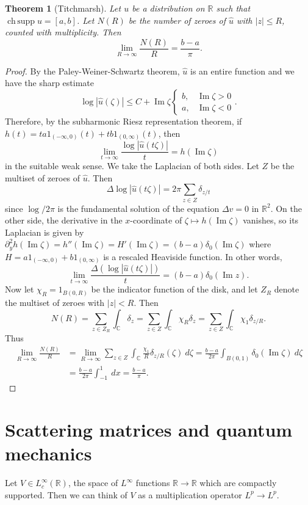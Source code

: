 \documentclass[12pt]{report}
\newcommand{\RR}{\mathbb{R}}
\newcommand{\CC}{\mathbb{C}}
\DeclareMathOperator*{\chsupp}{ch\,supp}
\renewcommand{\Im}{\operatorname{Im}}
\newtheorem{theorem}{Theorem}[chapter]
\theoremstyle{definition}
\begin{document}
\begin{theorem}[Titchmarsh]
Let $u$ be a distribution on $\RR$ such that $\chsupp u = [a, b]$. Let $N(R)$ be the number of zeroes of $\hat u$ with $|z| \leq R$, counted with multiplicity. Then
$$\lim_{R \to \infty} \frac{N(R)}{R} = \frac{b-a}{\pi}.$$
\end{theorem}
\begin{proof}
By the Paley-Weiner-Schwartz theorem, $\hat u$ is an entire function and we have the sharp estimate
$$\log |\hat u(\zeta)| \leq C + \Im \zeta \begin{cases}
    b, &\Im \zeta > 0\\
    a, &\Im \zeta < 0
\end{cases}.$$
Therefore, by the subharmonic Riesz representation theorem, if $h(t) = ta1_{(-\infty, 0)}(t) + tb1_{(0, \infty)}(t)$, then
$$\lim_{t \to \infty} \frac{\log |\hat u(t\zeta)|}{t} = h(\Im \zeta)$$
in the suitable weak sense. We take the Laplacian of both sides. Let $Z$ be the multiset of zeroes of $\hat u$. Then
$$\Delta \log |\hat u(t \zeta)| = 2\pi \sum_{z \in Z} \delta_{z/t}$$
since $\log/2\pi$ is the fundamental solution of the equation $\Delta v = 0$ in $\RR^2$. On the other side, the derivative in the $x$-coordinate of $\zeta \mapsto h(\Im \zeta)$ vanishes, so its Laplacian is given by $\partial_y^2 h(\Im \zeta) = h''(\Im \zeta) = H'(\Im \zeta) = (b-a)\delta_0(\Im \zeta)$ where $H = a1_{(-\infty, 0)} + b1_{(0, \infty)}$ is a rescaled Heaviside function. In other words,
$$\lim_{t \to \infty} \frac{\Delta(\log |\hat u(t\zeta)|)}{t} = (b-a)\delta_0(\Im z).$$
Now let $\chi_R = 1_{B(0, R)}$ be the indicator function of the disk, and let $Z_R$ denote the multiset of zeroes with $|z| < R$. Then
$$N(R) = \sum_{z \in Z_R} \int_\CC \delta_z = \sum_{z \in Z} \int_\CC \chi_R \delta_z = \sum_{z \in Z} \int_\CC \chi_1 \delta_{z/R}.$$
Thus
\begin{align*}
    \lim_{R \to \infty} \frac{N(R)}{R}
        &= \lim_{R \to \infty} \sum_{z \in Z} \int_\CC \frac{\chi_1}{R} \delta_{z/R}(\zeta) ~d\zeta = \frac{b - a}{2\pi} \int_{B(0, 1)} \delta_0(\Im \zeta) ~d\zeta\\
        &= \frac{b - a}{2 \pi} \int_{-1}^1 ~dx = \frac{b - a}{\pi}.
\end{align*}
\end{proof}




\section{Scattering matrices and quantum mechanics}
Let $V \in L^\infty_c(\RR)$, the space of $L^\infty$ functions $\RR \to \RR$ which are compactly supported. Then we can think of $V$ as a multiplication operator $L^p \to L^p$.
\end{document}
